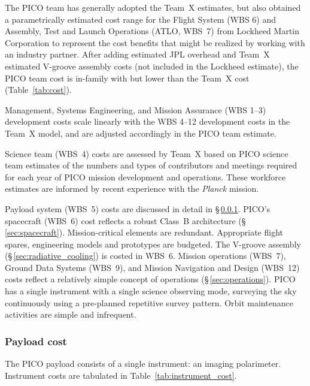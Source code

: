 The PICO team has generally adopted the Team~X estimates, but also
obtained a parametrically estimated cost range for the Flight System
(WBS 6) and Assembly, Test and Launch Operations (ATLO, WBS~7) from
Lockheed Martin Corporation to represent the cost benefits that might
be realized by working with an industry partner. After adding
estimated JPL overhead and Team~X estimated V-groove assembly costs
(not included in the Lockheed estimate), the PICO team cost is
in-family with but lower than the Team~X cost (Table~\ref{tab:cost}).

Management, Systems Engineering, and Mission Assurance (WBS 1--3)
development costs scale linearly with the WBS 4--12 development costs
in the Team~X model, and are adjusted accordingly in the PICO team
estimate.

Science team (WBS~4) costs are assessed by Team~X based on PICO
science team estimates of the numbers and types of contributors and
meetings required for each year of PICO mission development and
operations. These workforce estimates are informed by recent
experience with the \textit{Planck} mission.

Payload system (WBS~5) costs are discussed in detail in
\S\,\ref{sec:instrument_cost}.  PICO's spacecraft (WBS~6) cost
reflects a robust Class~B architecture
(\S\,\ref{sec:spacecraft}). Mission-critical elements are
redundant. Appropriate flight spares, engineering models and
prototypes are budgeted. The V-groove assembly (\S\,\ref{sec:radiative_cooling})
is costed in WBS~6.  Mission operations (WBS~7), Ground Data Systems
(WBS~9), and Mission Navigation and Design (WBS~12) costs reflect a
relatively simple concept of operations (\S\,\ref{sec:operations}). PICO has a single
instrument with a single science observing mode, surveying the sky
continuously using a pre-planned repetitive survey pattern. Orbit
maintenance activities are simple and infrequent.

\subsubsection{Payload cost}
\label{sec:instrument_cost} %

The PICO payload consists of a single instrument: an imaging
polarimeter. Instrument costs are tabulated in
Table~\ref{tab:instrument_cost}.


